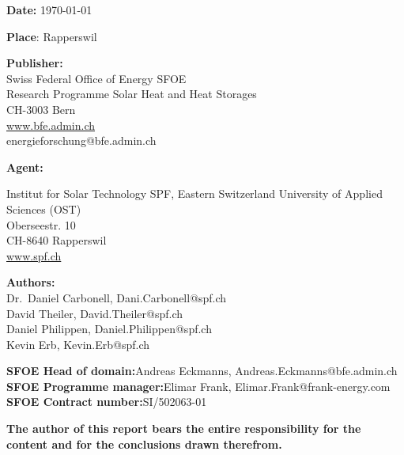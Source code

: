 \begin{flushleft}
\vspace*{\fill}

\textbf{Date:} \today \\
\vspace{4mm}

\textbf{Place}: Rapperswil\\
\vspace{4mm}

\textbf{Publisher:} \\
\vspace{1mm}
Swiss Federal Office of Energy SFOE \\
Research Programme Solar Heat and Heat Storages \\
CH-3003 Bern \\
\underline{www.bfe.admin.ch}\\
energieforschung@bfe.admin.ch\\

\vspace{4mm}

\textbf{Agent:}\\
\vspace{1mm}

Institut for Solar Technology SPF, Eastern Switzerland University of Applied Sciences (OST)\\
Oberseestr. 10 \\
CH-8640 Rapperswil \\
\underline{www.spf.ch} \\
\vspace{4mm}

\textbf{Authors:}\\
\vspace{1mm}
Dr.~Daniel Carbonell, Dani.Carbonell@spf.ch \\
David Theiler, David.Theiler@spf.ch \\
Daniel Philippen, Daniel.Philippen@spf.ch  \\
Kevin Erb, Kevin.Erb@spf.ch \\

\vspace{5mm}

\textbf{SFOE Head of domain:}\phantom{xxxxxx}Andreas Eckmanns, Andreas.Eckmanns@bfe.admin.ch\\
\textbf{SFOE Programme manager:}\phantom{x}Elimar Frank, Elimar.Frank@frank-energy.com\\
\textbf{SFOE Contract number:}\phantom{xxxxx}SI/502063-01
\vspace{6mm}

\textbf{The author of this report bears the entire responsibility for the content and for the conclusions
drawn therefrom.}

\end{flushleft}